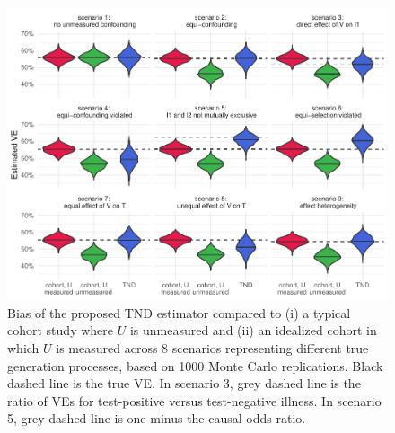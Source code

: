 \documentclass[11pt]{article}
\begin{document}
\begin{figure}
    \centering
    \includegraphics{sims.pdf}
    \caption{Bias of the proposed TND estimator compared to (i) a typical cohort study where $U$ is unmeasured and (ii) an idealized cohort in which $U$ is measured across 8 scenarios representing different true generation processes, based on 1000 Monte Carlo replications. Black dashed line is the true VE. In scenario 3, grey dashed line is the ratio of VEs for test-positive versus test-negative illness. In scenario 5, grey dashed line is one minus the causal odds ratio.}
    \label{fig:sims}
\end{figure}

\clearpage

\end{document}
